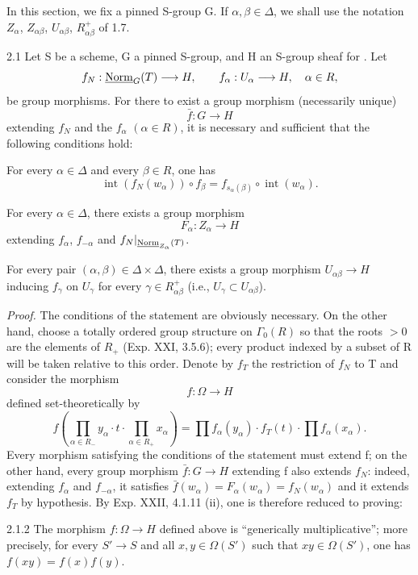In this section, we fix a pinned S-group G. If $\alpha,\beta\in\Delta$, we shall use the notation $Z_\alpha$, $Z_{\alpha\beta}$, $U_{\alpha\beta}$, $R^+_{\alpha\beta}$ of 1.7.
\begin{theorem}{2.1}\label{XXIII.2.1}
Let S be a scheme, G a pinned S-group, and H an S-group sheaf for \fppf. Let
\[
f_N:\underline{\mathrm{Norm}}_G(T)\longrightarrow H,\qquad f_\alpha:U_\alpha\longrightarrow H,\quad\alpha\in R,
\]
be group morphisms. For there to exist a group morphism (necessarily unique)
\[
\bar f:G\to H
\]
extending $f_N$ and the $f_\alpha$ $(\alpha\in R)$, it is necessary and sufficient that the following conditions hold:
\begin{enumeratei}
\item For every $\alpha\in\Delta$ and every $\beta\in R$, one has
\[
\operatorname{int}(f_N(w_\alpha))\circ f_\beta=f_{s_\alpha(\beta)}\circ\operatorname{int}(w_\alpha).
\]
\item For every $\alpha\in\Delta$, there exists a group morphism
\[
F_\alpha:Z_\alpha\to H
\]
extending $f_\alpha$, $f_{-\alpha}$ and $f_N|_{\underline{\mathrm{Norm}}_{Z_\alpha}(T)}$.
\item For every pair $(\alpha,\beta)\in\Delta\times\Delta$, there exists a group morphism $U_{\alpha\beta}\to H$ inducing $f_\gamma$ on $U_\gamma$ for every $\gamma\in R^+_{\alpha\beta}$ (i.e., $U_\gamma\subset U_{\alpha\beta}$).
\end{enumeratei}
\end{theorem}
\emph{Proof.}
The conditions of the statement are obviously necessary. On the other hand, choose a totally ordered group structure on $\Gamma_0(R)$ so that the roots $>0$ are the elements of $R_+$ (Exp. XXI, 3.5.6); every product indexed by a subset of R will be taken relative to this order. Denote by $f_T$ the restriction of $f_N$ to T and consider the morphism
\[
f:\Omega\to H
\]
defined set-theoretically by
\[
f\left(\prod_{\alpha\in R_-}y_\alpha\cdot t\cdot\prod_{\alpha\in R_+}x_\alpha\right)
=\prod f_\alpha(y_\alpha)\cdot f_T(t)\cdot\prod f_\alpha(x_\alpha).
\]
Every morphism satisfying the conditions of the statement must extend f; on the other hand, every group morphism $\bar f:G\to H$ extending f also extends $f_N$: indeed, extending $f_\alpha$ and $f_{-\alpha}$, it satisfies $\bar f(w_\alpha)=F_\alpha(w_\alpha)=f_N(w_\alpha)$ and it extends $f_T$ by hypothesis. By Exp. XXII, 4.1.11 (ii), one is therefore reduced to proving:
\begin{proposition}{2.1.2}\label{XXIII.2.1.2}
The morphism $f:\Omega\to H$ defined above is ``generically multiplicative''; more precisely, for every $S'\to S$ and all $x,y\in\Omega(S')$ such that $xy\in\Omega(S')$, one has $f(xy)=f(x)f(y)$.
\end{proposition}
